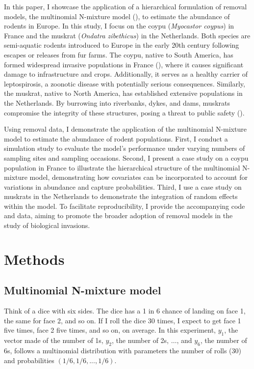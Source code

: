 \documentclass[
  11pt,
  a4paper,
]{article}
\begin{document}
In this paper, I showcase the application of a hierarchical formulation of removal models, the multinomial N-mixture model (), to estimate the abundance of rodents in Europe. In this study, I focus on the coypu (\emph{Myocastor coypus}) in France and the muskrat (\emph{Ondatra zibethicus}) in the Netherlands. Both species are semi-aquatic rodents introduced to Europe in the early 20th century following escapes or releases from fur farms. The coypu, native to South America, has formed widespread invasive populations in France (), where it causes significant damage to infrastructure and crops. Additionally, it serves as a healthy carrier of leptospirosis, a zoonotic disease with potentially serious consequences. Similarly, the muskrat, native to North America, has established extensive populations in the Netherlands. By burrowing into riverbanks, dykes, and dams, muskrats compromise the integrity of these structures, posing a threat to public safety ().

Using removal data, I demonstrate the application of the multinomial N-mixture model to estimate the abundance of rodent populations. First, I conduct a simulation study to evaluate the model's performance under varying numbers of sampling sites and sampling occasions. Second, I present a case study on a coypu population in France to illustrate the hierarchical structure of the multinomial N-mixture model, demonstrating how covariates can be incorporated to account for variations in abundance and capture probabilities. Third, I use a case study on muskrats in the Netherlands to demonstrate the integration of random effects within the model. To facilitate reproducibility, I provide the accompanying code and data, aiming to promote the broader adoption of removal models in the study of biological invasions.

\section{Methods}\label{methods}

\subsection{Multinomial N-mixture model}\label{multinomial-n-mixture-model}

Think of a dice with six sides. The dice has a 1 in 6 chance of landing on face 1, the same for face 2, and so on. If I roll the dice 30 times, I expect to get face 1 five times, face 2 five times, and so on, on average. In this experiment, \(y_1\), the vector made of the number of 1s, \(y_2\), the number of 2s, \(\ldots\), and \(y_6\), the number of 6s, follows a multinomial distribution with parameters the number of rolls (30) and probabilities \((1/6, 1/6, ..., 1/6)\).
\end{document}
